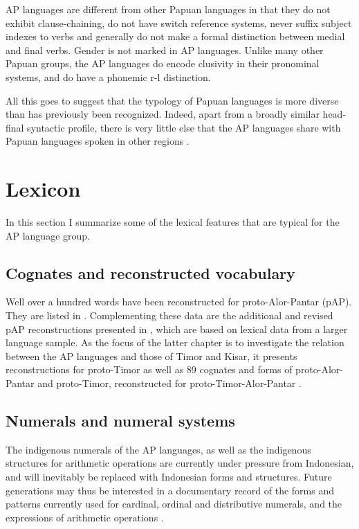 AP languages are different from other Papuan languages in that they do not exhibit clause-chaining, do not have switch reference systems, never suffix subject indexes to verbs and generally do not make a formal distinction between medial and final verbs. Gender is not marked in AP languages. Unlike many other Papuan groups, the AP languages do encode clusivity in their pronominal systems, and do have a phonemic r-l distinction. 

All this goes to suggest that the typology of Papuan languages is more diverse than has previously been recognized. Indeed, apart from a broadly similar head-final syntactic profile, there is very little else that the AP languages share with Papuan languages spoken in other regions \citep[see also][]{HoltonRobinsonTVposition}.

\section{Lexicon}\label{sec:1:6}

In this section I summarize some of the lexical features that are typical for the AP language group. 

\subsection{Cognates and reconstructed vocabulary} \label{sec:1:6.1}
Well over a hundred words have been reconstructed for proto-Alor-Pantar (pAP). They are listed in \citet[Appendix]{HoltonRobinsonTVhistory}. Complementing these data are the additional and revised pAP reconstructions presented in \citet[Appendix 1]{SchapperEtAlTVtimor}, which are based on lexical data from a larger language sample. As the focus of the latter chapter is to investigate the relation between the AP languages and those of Timor and Kisar, it presents reconstructions for proto-Timor as well as 89 cognates and forms of proto-Alor-Pantar and proto-Timor, reconstructed for proto-Timor-Alor-Pantar \citet[Appendix 2 and 3]{SchapperEtAlTVtimor}.

\subsection{Numerals and numeral systems}\label{sec:1:6.2}
The indigenous numerals of the AP languages, as well as the indigenous structures for arithmetic operations are currently under pressure from Indonesian, and will inevitably be replaced with Indonesian forms and structures. Future generations may thus be interested in a documentary record of the forms and patterns currently used for cardinal, ordinal and distributive numerals, and the expressions of arithmetic operations \citep{KlamerSchapperCorbettTVnumeralwords}.

